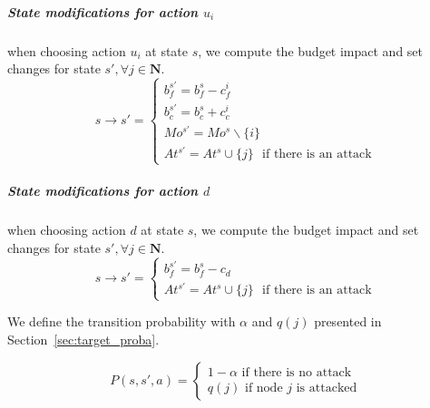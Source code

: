 \subparagraph*{\textbf{State modifications for action $u_i$}}
when choosing action $u_i$ at state $s$, we compute the budget impact and set changes for state $s', \forall j \in \textbf{N}$. 
\begin{equation}
  s \longrightarrow s' =\begin{cases}
    b_f^{s'} = b_f^s - c_f^i\\
    b_c^{s'} = b_c^s + c_c^ i\\
    Mo^{s'} = Mo^s \backslash\{i\}\\
    At^{s'} = At^s \cup \{j\}\text{~~if there is an attack}
  \end{cases}
\end{equation}

\subparagraph*{\textbf{State modifications for action $d$}}
when choosing action $d$ at state $s$, we compute the budget impact and set changes for state $s', \forall j \in \textbf{N}$. 
\begin{equation}
  s \longrightarrow s' =\begin{cases}
    b_f^{s'} = b_f^s - c_d\\
    At^{s'} = At^s \cup \{j\}\text{~~if there is an attack}
  \end{cases}
\end{equation}


We define the transition probability with $\alpha$ and $q(j)$ presented in Section~\ref{sec:target_proba}.


    
\begin{equation}
    P(s,s',a) = \begin{cases}
        1-\alpha \text{ if there is no attack}\\
        q(j)\text{ if node $j$ is attacked}
    \end{cases}
\end{equation}
